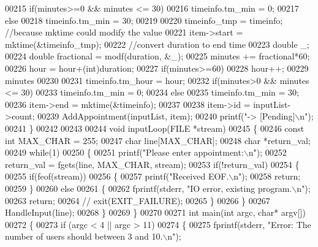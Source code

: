 \begin{DoxyCode}
{{{{{{00215     \textcolor{keywordflow}{if}(minutes>=0 && minutes <= 30)
00216         timeinfo.tm\_min = 0;
00217     \textcolor{keywordflow}{else}
00218         timeinfo.tm\_min = 30;
00219 
00220     timeinfo\_tmp = timeinfo;    \textcolor{comment}{//because mktime could modify the value}
00221     item->start = mktime(&timeinfo\_tmp);
00222     \textcolor{comment}{//convert duration to end time}
00223     \textcolor{keywordtype}{double} \_;
00224     \textcolor{keywordtype}{double} fractional = modf(duration, &\_);
00225     minutes += fractional*60;
00226     hour = hour+(int)duration;
00227     \textcolor{keywordflow}{if}(minutes>=60)
00228         hour++;
00229     minutes %
00230 
00231     timeinfo.tm\_hour = hour;
00232     \textcolor{keywordflow}{if}(minutes>0 && minutes <= 30)
00233         timeinfo.tm\_min = 0;
00234     \textcolor{keywordflow}{else}
00235         timeinfo.tm\_min = 30;
00236     item->end = mktime(&timeinfo);
00237 
00238     item->id = inputList->count;
00239     AddAppointment(inputList, item);
00240     printf(\textcolor{stringliteral}{"-> [Pending]\(\backslash\)n"});
00241 \}
00242 
00243 
00244 \textcolor{keywordtype}{void} inputLoop(FILE *stream)
00245 \{
00246     \textcolor{keyword}{const} \textcolor{keywordtype}{int} MAX\_CHAR = 255;
00247     \textcolor{keywordtype}{char} line[MAX\_CHAR];
00248     \textcolor{keywordtype}{char} *return\_val;
00249     \textcolor{keywordflow}{while}(1)
00250     \{
00251         printf(\textcolor{stringliteral}{"Please enter appointment:\(\backslash\)n"});
00252         return\_val = fgets(line, MAX\_CHAR, stream);
00253         \textcolor{keywordflow}{if}(!return\_val)
00254         \{
00255             \textcolor{keywordflow}{if}(feof(stream))
00256             \{
00257                 printf(\textcolor{stringliteral}{"Received EOF.\(\backslash\)n"});
00258                 \textcolor{keywordflow}{return};
00259             \}
00260             \textcolor{keywordflow}{else}
00261             \{
00262                 fprintf(stderr, \textcolor{stringliteral}{"IO error, existing program.\(\backslash\)n"});
00263                 \textcolor{keywordflow}{return};
00264                 \textcolor{comment}{// exit(EXIT\_FAILURE);}
00265             \}
00266         \}
00267         HandleInput(line);
00268     \}
00269 \}
00270 
00271 \textcolor{keywordtype}{int} main(\textcolor{keywordtype}{int} argc, \textcolor{keywordtype}{char}* argv[])
00272 \{
00273     \textcolor{keywordflow}{if} (argc < 4 || argc > 11)
00274     \{
00275         fprintf(stderr, \textcolor{stringliteral}{"Error: The number of users should between 3 and 10.\(\backslash\)n"});
}}}}}}
\end{DoxyCode}
